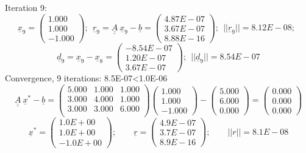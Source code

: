\documentclass{report}[10pts]
\begin{document}
\begin{small}
Iteration 9:
\[
\underline{x}_{9}=
   \begin{pmatrix}
   1.000 \\ 1.000 \\ -1.000
   \end{pmatrix}
;~~
\underline{r}_{9}=
\underline{\underline{A}}~\underline{x}_{9}-
\underline{b}=
   \begin{pmatrix}
   4.87E-07 \\ 3.67E-07 \\ 8.88E-16
   \end{pmatrix}
;~~
||
\underline{r}_{9}
||=
8.12E-08
;~~
\]
\[
\underline{d}_{9}=
\underline{x}_{9}-
\underline{x}_{8}=
   \begin{pmatrix}
   -8.54E-07 \\ 1.20E-07 \\ 3.67E-07
   \end{pmatrix}
;~~
||
\underline{d}_{9}
||=
8.54E-07
\]
Convergence, 9 iterations: 8.5E-07<1.0E-06
\[
   \underline{\underline{A}}~\underline{x}^*-\underline{b}=
      \begin{pmatrix}
         5.000 & 1.000 & 1.000\\
         3.000 & 4.000 & 1.000\\
         3.000 & 3.000 & 6.000\\
      \end{pmatrix}
      \begin{pmatrix}
      1.000 \\ 1.000 \\ -1.000
      \end{pmatrix}
   -
      \begin{pmatrix}
      5.000 \\ 6.000 \\ 0.000
      \end{pmatrix}
   =
      \begin{pmatrix}
      0.000 \\ 0.000 \\ 0.000
      \end{pmatrix}
\]
\[
   \underline{x}^*=
      \begin{pmatrix}
      1.0E+00 \\ 1.0E+00 \\ -1.0E+00
      \end{pmatrix}
   ;\qquad
      \underline{r}=
      \begin{pmatrix}
      4.9E-07 \\ 3.7E-07 \\ 8.9E-16
      \end{pmatrix}
   ;\qquad
   ||r||=8.1E-08
\]
\end{small}
\end{document}
